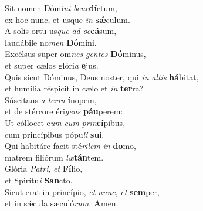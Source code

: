 \evenverse Sit nomen Dómi\textit{ni} \textit{be}\textit{ne}\textbf{dí}ctum,~\*\\
\evenverse ex hoc nunc, et usque \textit{in} \textbf{sǽ}culum.\\
\oddverse A solis ortu us\textit{que} \textit{ad} \textit{oc}\textbf{cá}sum,~\*\\
\oddverse laudábile no\textit{men} \textbf{Dó}mini.\\
\evenverse Excélsus super om\textit{nes} \textit{gen}\textit{tes} \textbf{Dó}minus,~\*\\
\evenverse et super cælos glóri\textit{a} \textbf{e}jus.\\
\oddverse Quis sicut Dóminus, Deus noster, qui \textit{in} \textit{al}\textit{tis} \textbf{há}bitat,~\*\\
\oddverse et humília réspicit in cælo et \textit{in} \textbf{ter}ra?\\
\evenverse Súscitans \textit{a} \textit{ter}\textit{ra} \textbf{í}nopem,~\*\\
\evenverse et de stércore éri\textit{gens} \textbf{páu}perem:\\
\oddverse Ut cóllocet e\textit{um} \textit{cum} \textit{prin}\textbf{cí}pibus,~\*\\
\oddverse cum princípibus pópu\textit{li} \textbf{su}i.\\
\evenverse Qui habitáre facit sté\textit{ri}\textit{lem} \textit{in} \textbf{do}mo,~\*\\
\evenverse matrem filiórum \textit{læ}\textbf{tán}tem.\\
\oddverse Glória \textit{Pa}\textit{tri}, \textit{et} \textbf{Fí}lio,~\*\\
\oddverse et Spirítu\textit{i} \textbf{San}cto.\\
\evenverse Sicut erat in princípio, \textit{et} \textit{nunc}, \textit{et} \textbf{sem}per,~\*\\
\evenverse et in sǽcula sæculó\textit{rum}. \textbf{A}men.\\
